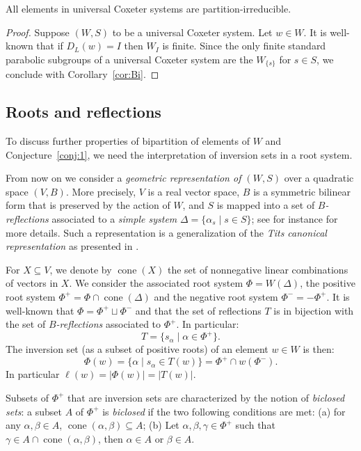 \documentclass[Unicode]{cedram-alco}
\theoremstyle{definition}
\newcommand{\cone}{\operatorname{cone}}
\begin{document}
\begin{prop}\label{prop:Conj1True} All elements in universal Coxeter systems are partition-irreducible. 
\end{prop}
\begin{proof} Suppose $(W,S)$ to be a universal Coxeter system. Let $w\in W$. It is well-known that if $D_L(w)=I$ then $W_I$ is finite. Since the only finite standard parabolic subgroups of a universal Coxeter system are the $W_{\{s\}}$ for $s\in S$, we conclude with Corollary~\ref{cor:Bi}. 
\end{proof}

\subsection{Roots and reflections} To discuss further properties of bipartition of elements of $W$ and Conjecture~\ref{conj:1}, we need the interpretation of inversion sets in a root system.

From now on  we consider a {\em geometric representation of $(W,S)$} over a quadratic space $(V,B)$. More precisely,  $V$ is a real vector space, $B$ is a symmetric bilinear form that is preserved by the action of $W$, and $S$ is mapped into a set of {\em $B$-reflections} associated to a {\em simple system} $\Delta=\{\alpha_s\mid s\in S\}$;  see for instance \cite[\S2.1]{HoLa16} for more details. Such a representation is a generalization of the {\em Tits canonical representation} as presented in \cite[\S4.1]{BjBr05}. 

For $X\subseteq V$, we denote by $\cone(X)$ the set of nonnegative linear combinations of vectors in $X$. We consider the associated root system $\Phi=W(\Delta)$, the positive root system $\Phi^+=\Phi\cap \cone(\Delta)$ and the negative root system $\Phi^-=-\Phi^+$. It is well-known that $\Phi=\Phi^+\sqcup \Phi^-$ and that the set of reflections $T$ is in bijection with the set of {\em $B$-reflections} associated to $\Phi^+$. In particular:
$$
T=\{s_\alpha\mid \alpha\in\Phi^+\}.
$$
The inversion set (as a subset of positive roots) of an element $w\in W$ is then:
$$
\Phi(w)=\{\alpha \mid s_\alpha \in T(w)\}=\Phi^+\cap w(\Phi^-).
$$
In particular $\ell(w)=|\Phi(w)|=|T(w)|$.

Subsets of $\Phi^+$ that are inversion sets are characterized by the notion of {\em biclosed sets}: a subset $A$ of $\Phi^+$ is {\em biclosed} if the two following conditions are met: (a) for any $\alpha,\beta \in A$, $\cone(\alpha,\beta)\subseteq A$; (b) Let $\alpha,\beta,\gamma\in \Phi^+$ such that $\gamma\in A\cap \cone(\alpha,\beta)$, then $\alpha\in A$ or $\beta\in A$. 
\end{document}
